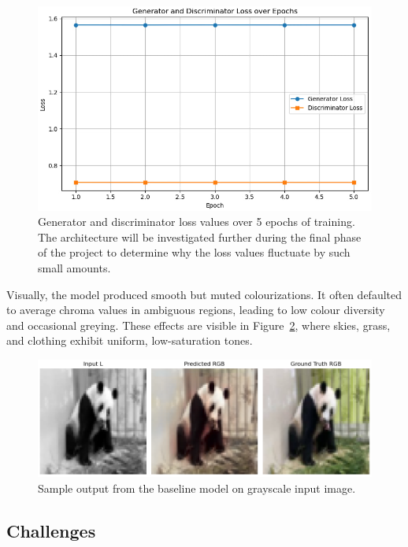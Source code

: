 \documentclass{article} %
\begin{document}
\begin{figure}[htbp]
    \centering
    \includegraphics[width=\textwidth]{Figs/baseline_learning_curve.jpg}
    \caption{Generator and discriminator loss values over 5 epochs of training. The architecture will be investigated further during the final phase of the project to determine why 
    the loss values fluctuate by such small amounts.}

    \label{fig:baseline_outputs}
\end{figure}

Visually, the model produced smooth but muted colourizations. It often defaulted to average chroma values in ambiguous regions, leading to low colour diversity and occasional greying. These effects are visible in Figure~\ref{fig:baseline_outputs}, where skies, grass, and clothing exhibit uniform, low-saturation tones.

\begin{figure}[htbp]
    \centering
    \includegraphics[width=\textwidth]{Figs/baseline_output.png}
    \caption{Sample output from the baseline model on grayscale input image.}
    \label{fig:baseline_outputs}
\end{figure}

\subsection{Challenges}
\end{document}
